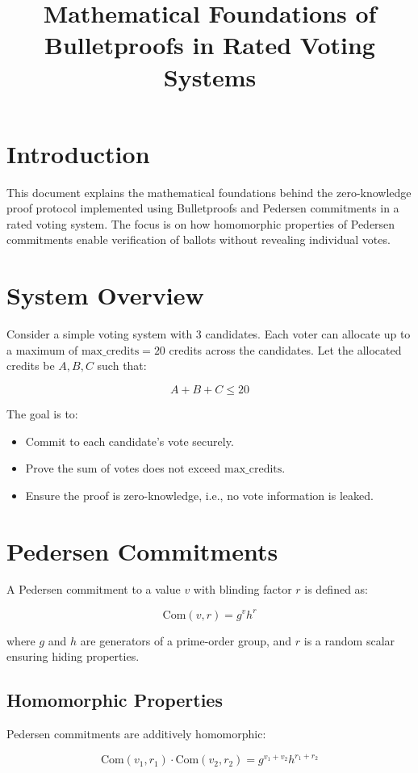 \documentclass{article}
\title{Mathematical Foundations of Bulletproofs in Rated Voting Systems}
\author{}
\date{}
\begin{document}
\maketitle

\section{Introduction}
This document explains the mathematical foundations behind the zero-knowledge proof protocol implemented using Bulletproofs and Pedersen commitments in a rated voting system. The focus is on how homomorphic properties of Pedersen commitments enable verification of ballots without revealing individual votes.

\section{System Overview}
Consider a simple voting system with 3 candidates. Each voter can allocate up to a maximum of \( \text{max\_credits} = 20 \) credits across the candidates. Let the allocated credits be \( A, B, C \) such that:

\[
A + B + C \leq 20
\]

The goal is to:
\begin{itemize}
    \item Commit to each candidate's vote securely.
    \item Prove the sum of votes does not exceed \( \text{max\_credits} \).
    \item Ensure the proof is zero-knowledge, i.e., no vote information is leaked.
\end{itemize}

\section{Pedersen Commitments}
A Pedersen commitment to a value \( v \) with blinding factor \( r \) is defined as:

\[
\text{Com}(v, r) = g^v h^r
\]

where \( g \) and \( h \) are generators of a prime-order group, and \( r \) is a random scalar ensuring hiding properties.

\subsection{Homomorphic Properties}
Pedersen commitments are additively homomorphic:

\[
\text{Com}(v_1, r_1) \cdot \text{Com}(v_2, r_2) = g^{v_1 + v_2} h^{r_1 + r_2}
\]
\end{document}
